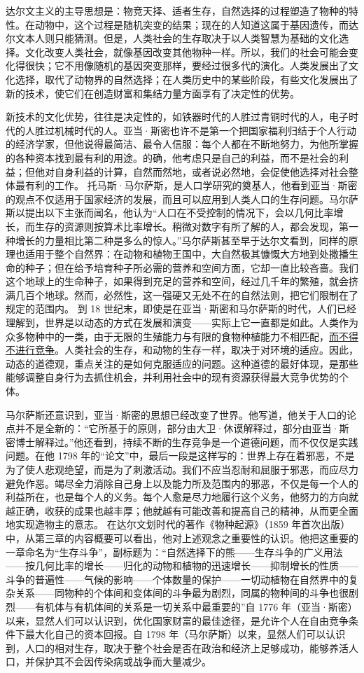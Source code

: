 达尔文主义的主导思想是：物竞天择、适者生存，自然选择的过程塑造了物种的特性。在动物中，这个过程是随机突变的结果；现在的人知道这属于基因遗传，而达尔文本人则只能猜测。但是，人类社会的生存取决于以人类智慧为基础的文化选择。文化改变人类社会，就像基因改变其他物种一样。所以，我们的社会可能会变化得很快；它不用像随机的基因突变那样，要经过很多代的演化。人类发展出了文化选择，取代了动物界的自然选择；在人类历史中的某些阶段，有些文化发展出了新的技术，使它们在创造财富和集结力量方面享有了决定性的优势。

新技术的文化优势，往往是决定性的，如铁器时代的人胜过青铜时代的人，电子时代的人胜过机械时代的人。亚当·斯密也许不是第一个把国家福利归结于个人行动的经济学家，但他说得最简洁、最令人信服：每个人都在不断地努力，为他所掌握的各种资本找到最有利的用途。的确，他考虑只是自己的利益，而不是社会的利益；但他对自身利益的计算，自然而然地，或者说必然地，会促使他选择对社会整体最有利的工作。 托马斯·马尔萨斯，是人口学研究的奠基人，他看到亚当·斯密的观点不仅适用于国家经济的发展，而且可以应用到人类人口的生存问题。马尔萨斯以提出以下主张而闻名，他认为“人口在不受控制的情况下，会以几何比率增长，而生存的资源则按算术比率增长。稍微对数字有所了解的人，都会发现，第一种增长的力量相比第二种是多么的惊人。”马尔萨斯甚至早于达尔文看到，同样的原理也适用于整个自然界：在动物和植物王国中，大自然极其慷慨大方地到处撒播生命的种子；但在给予培育种子所必需的营养和空间方面，它却一直比较吝啬。我们这个地球上的生命种子，如果得到充足的营养和空间，经过几千年的繁殖，就会挤满几百个地球。然而，必然性，这一强硬又无处不在的自然法则，把它们限制在了规定的范围内。 到 18 世纪末，即使是在亚当·斯密和马尔萨斯的时代，人们已经理解到，世界是以动态的方式在发展和演变——实际上它一直都是如此。人类作为众多物种中的一类，由于无限的生殖能力与有限的食物种植能力不相匹配，\uline{而不得不进行竞争}。人类社会的生存，和动物的生存一样，取决于对环境的适应。因此，动态的道德观，重点关注的是如何克服适应的问题。这种道德的最好体现，是那些能够调整自身行为去抓住机会，并利用社会中的现有资源获得最大竞争优势的个体。

马尔萨斯还意识到，亚当·斯密的思想已经改变了世界。他写道，他关于人口的论点并不是全新的：“它所基于的原则，部分由大卫·休谟解释过，部分由亚当·斯密博士解释过。”他还看到，持续不断的生存竞争是一个道德问题，而不仅仅是实践问题。在他 1798 年的“论文”中，最后一段是这样写的：世界上存在着邪恶，不是为了使人悲观绝望，而是为了刺激活动。我们不应当忍耐和屈服于邪恶，而应尽力避免作恶。竭尽全力消除自己身上以及能力所及范围内的邪恶，不仅是每一个人的利益所在，也是每个人的义务。每个人愈是尽力地履行这个义务，他努力的方向就越正确，收获的成果也越丰厚；他就越有可能改善和提高自己的精神，从而更全面地实现造物主的意志。 在达尔文划时代的著作《物种起源》（1859 年首次出版）中，从第三章的内容概要可以看出，他对上述观念之重要性的认识。他把这重要的一章命名为“生存斗争”，副标题为：“自然选择下的熊——生存斗争的广义用法——按几何比率的增长——归化的动物和植物的迅速增长——抑制增长的性质——斗争的普遍性——气候的影响——个体数量的保护——一切动植物在自然界中的复杂关系——同物种的个体间和变体间的斗争最为剧烈，同属的物种间的斗争也很剧烈——有机体与有机体间的关系是一切关系中最重要的”自 1776 年（亚当·斯密）以来，显然人们可以认识到，优化国家财富的最佳途径，是允许个人在自由竞争条件下最大化自己的资本回报。自 1798 年（马尔萨斯）以来，显然人们可以认识到，人口的相对生存，取决于整个社会是否在政治和经济上足够成功，能够养活人口，并保护其不会因传染病或战争而大量减少。

